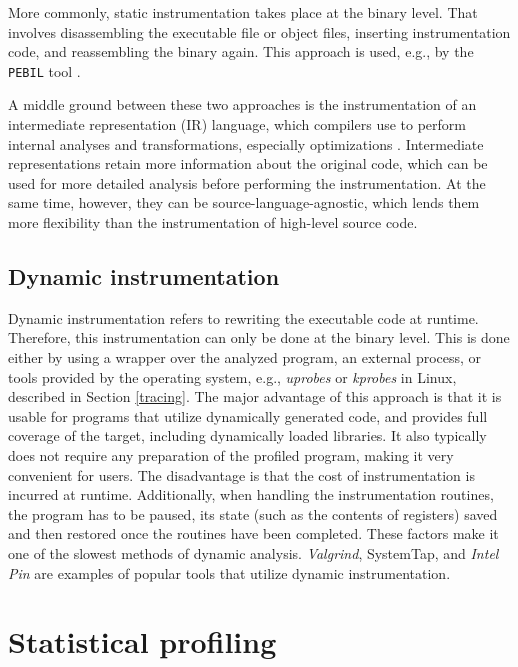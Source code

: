 More commonly, static instrumentation takes place at the binary level. That involves disassembling the executable file or object files, inserting instrumentation code, and reassembling the binary again. This approach is used, e.g., by the \texttt{PEBIL} tool \cite{pebil}.

A middle ground between these two approaches is the instrumentation of an intermediate representation (IR) language, which compilers use to perform internal analyses and transformations, especially optimizations \cite{advanced-compiler-design}. Intermediate representations retain more information about the original code, which can be used for more detailed analysis before performing the instrumentation. At the same time, however, they can be source-language-agnostic, which lends them more flexibility than the instrumentation of high-level source code.


\subsection{Dynamic instrumentation}
Dynamic instrumentation refers to rewriting the executable code at runtime. Therefore, this instrumentation can only be done at the binary level. This is done either by using a wrapper over the analyzed program, an external process, or tools provided by the operating system, e.g., \emph{uprobes} or \emph{kprobes} in Linux, described in Section \ref{tracing}. The major advantage of this approach is that it is usable for programs that utilize dynamically generated code, and provides full coverage of the target, including dynamically loaded libraries. It also typically does not require any preparation of the profiled program, making it very convenient for users. The disadvantage is that the cost of instrumentation is incurred at runtime. Additionally, when handling the instrumentation routines, the program has to be paused, its state (such as the contents of registers) saved and then restored once the routines have been completed. These factors make it one of the slowest methods of dynamic analysis. \emph{Valgrind}, SystemTap, and \emph{Intel Pin} are examples of popular tools that utilize dynamic instrumentation. \cite{valgrind, nethercote-dyn-bin}

\section{Statistical profiling}

